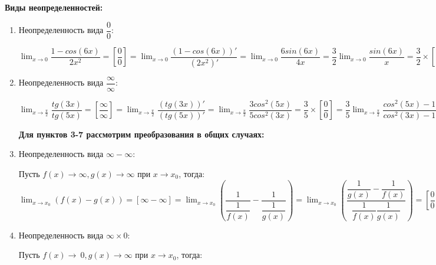 \documentclass[oneside]{book}
\begin{document}
\begin{itemize}
\begin{enumerate}
\end{enumerate}

\textbf{Виды неопределенностей:}
\begin{enumerate}
	\item Неопределенность вида $\dfrac{0}{0}$:

	$\lim_{x \to 0} \dfrac{1-cos(6x)}{2x^{2}}=
	[\dfrac{0}{0}]=
	\lim_{x \to 0} \dfrac{(1-cos(6x))'}{(2x^{2})'}=
	\lim_{x \to 0} \dfrac{6sin(6x)}{4x}=
	\dfrac{3}{2}\lim_{x \to 0} \dfrac{sin(6x)}{x}=
	\dfrac{3}{2}\times[\dfrac{0}{0}]=
	\dfrac{3}{2}\lim_{x \to 0} \dfrac{(sin(6x))'}{(x)'}=
	\dfrac{3}{2}\lim_{x \to 0} \dfrac{6cos(6x)}{1}=
	\dfrac{3}{2}\times 6=9$

	\item Неопределенность вида $\dfrac{\infty}{\infty}$:

	$\lim_{x \to \frac{\pi}{2}} \dfrac{tg(3x)}{tg(5x)}=
	[\dfrac{\infty}{\infty}]=
	\lim_{x \to \frac{\pi}{2}} \dfrac{(tg(3x))'}{(tg(5x))'}=
	\lim_{x \to \frac{\pi}{2}}\dfrac{3cos^{2}(5x)}{5cos^{2}(3x)}=
	\dfrac{3}{5}\times[\dfrac{0}{0}]=
	\dfrac{3}{5}\lim_{x \to \frac{\pi}{2}}\dfrac{cos^{2}(5x)-1+1}{cos^{2}(3x)-1+1}=
	\dfrac{3}{5}\lim_{x \to\frac{\pi}{2}}\dfrac{cos(10x)+1}{cos(6x)+1}=
	\dfrac{3}{5}\times[\dfrac{0}{0}]=
	\dfrac{3}{5}\lim_{x \to \frac{\pi}{2}} \dfrac{(cos(10x)+1)'}{(cos(6x)+1)'}=
	\dfrac{3}{5}\lim_{x \to \frac{\pi}{2}} \dfrac{10sin(10x)}{6sin(6x)}=
	\lim_{x \to \frac{\pi}{2}} \dfrac{sin(10x)}{sin(6x)}=
	[\dfrac{0}{0}]=
	\lim_{x \to \frac{\pi}{2}} \dfrac{(sin(10x))'}{(sin(6x))'}=
	\lim_{x \to \frac{\pi}{2}} \dfrac{10cos(10x)}{6cos(6x)}=
	\dfrac{5}{3}$

	\textbf{Для пунктов 3-7 рассмотрим преобразования в общих случаях:}

	\item Неопределенность вида $\infty-\infty$:

	 Пусть $f(x)\to\infty, g(x)\to\infty$ при $x\to x_{0}$, тогда:\\

	 $\lim_{x \to x_{0}} (f(x)-g(x))=
	 [\infty-\infty]=
	 \lim_{x \to x_{0}} (\dfrac{1}{\dfrac{1}{f(x)}}-\dfrac{1}{\dfrac{1}{g(x)}})=
	 \lim_{x \to x_{0}} (\dfrac{{\dfrac{1}{g(x)}}-{\dfrac{1}{f(x)}}}{{\dfrac{1}{f(x)}}{\dfrac{1}{g(x)}}})=
	 [\dfrac{0}{0}]=...$

	\item Неопределенность вида $\infty\times 0$:

	Пусть $f(x)\to\ 0, g(x)\to\infty$ при $x\to x_{0}$, тогда:\\


\end{enumerate}
\end{itemize}
\end{document}
